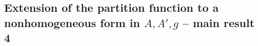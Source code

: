 \documentclass[11pt,a4paper]{amsart}
\theoremstyle{plain} %
\theoremstyle{definition}
\theoremstyle{remark}
\newcommand{\g}{\mathfrak{g}}
\newcommand{\sfa}{\mathsf{a}}
\newcommand{\sh}{\mathsf{h}}
\begin{document}

\subsection{Extension of %
the partition function to a nonhomogeneous form in $A,A',g$ -- main result 4
}
\label{ss intro:Zcheck}
\end{document}
